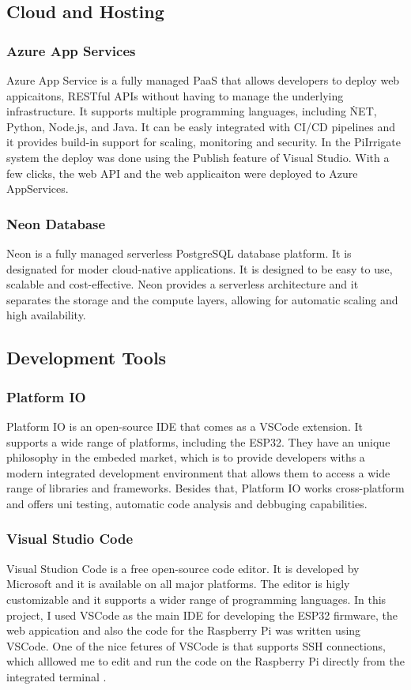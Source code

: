 \subsection{Cloud and Hosting}
\subsubsection{Azure App Services}
Azure App Service is a fully managed PaaS that allows developers to deploy web appicaitons, RESTful APIs without having to manage the
underlying infrastructure. It supports multiple programming languages, including \.NET, Python, Node.js, and Java. It can be
easly integrated with CI/CD pipelines and it provides build-in support for scaling, monitoring and security\cite{azure_app_service}.
In the PiIrrigate system the deploy was done using the Publish feature of Visual Studio. With a few clicks, the web API and the web applicaiton
were deployed to Azure AppServices.

\subsubsection{Neon Database}
Neon is a fully managed serverless PostgreSQL database platform. It is designated for moder cloud-native applications. It is 
designed to be easy to use, scalable and cost-effective. Neon provides a serverless architecture and it separates the storage and the compute layers,
allowing for automatic scaling and high availability.

\subsection{Development Tools}
\subsubsection{Platform IO}
Platform IO is an open-source IDE that comes as a VSCode extension. It supports a wide range of platforms, including the ESP32.
They have an unique philosophy in the embeded market, which is to provide developers withs a modern integrated development environment that
allows them to access a wide range of libraries and frameworks. Besides that, Platform IO works cross-platform and offers uni testing, automatic code
analysis and debbuging capabilities\cite{python_org}\cite{python}\cite{peps}.

\subsubsection{Visual Studio Code}
Visual Studion Code is a free open-source code editor. It is developed by Microsoft and it is available on all major platforms.
The editor is higly customizable and it supports a wider range of programming languages. In this project, I used VSCode 
as the main IDE for developing the ESP32 firmware, the web appication and also the code for the Raspberry Pi was written using VSCode. One of the nice
fetures of VSCode is that supports SSH connections, which alllowed me to edit and run the code on the Raspberry Pi directly from the integrated terminal
\cite{visualstudio_docs}.

